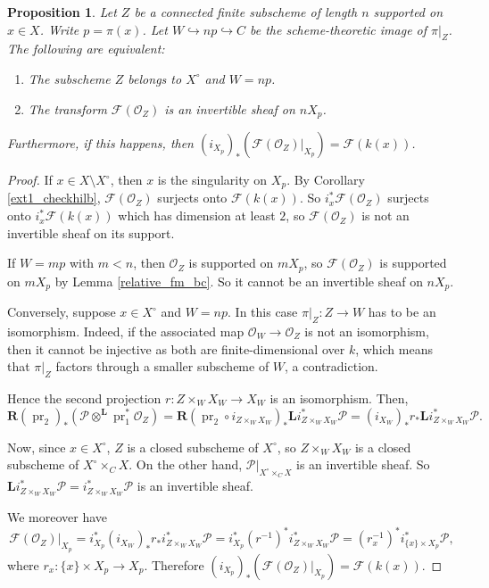 \documentclass{amsart}
\theoremstyle{plain}
\newtheorem{proposition}[theorem]{Proposition}
\theoremstyle{definition}
\theoremstyle{remark}
\begin{document}
    \begin{proposition}\label{geom_desc}
        Let $Z$ be a connected finite subscheme of length $n$ supported on $x\in X$.
        Write $p=\pi(x)$.
        Let $W\hookrightarrow np\hookrightarrow C$ be the scheme-theoretic image of $\pi|_Z$.
        The following are equivalent:
        \begin{enumerate}
            \item The subscheme $Z$ belongs to $X^\circ$ and $W=np$.
            \item The transform $\mathcal F(\mathcal O_Z)$ is an invertible sheaf on $nX_p$.
        \end{enumerate}
        Furthermore, if this happens, then $(i_{X_p})_\ast(\mathcal F(\mathcal O_Z)|_{X_p})=\mathcal F(k(x))$.
    \end{proposition}
    \begin{proof}
        If $x\in X\setminus X^\circ$, then $x$ is the singularity on $X_p$.
        By Corollary \ref{ext1_checkhilb}, $\mathcal F(\mathcal O_Z)$ surjects onto $\mathcal F(k(x))$.
        So $i_x^\ast \mathcal F(\mathcal O_Z)$ surjects onto $i_x^\ast\mathcal F(k(x))$ which has dimension at least $2$, so $\mathcal F(\mathcal O_Z)$ is not an invertible sheaf on its support.

        If $W=mp$ with $m<n$, then $\mathcal O_Z$ is supported on $mX_p$, so $\mathcal F(\mathcal O_Z)$ is supported on $mX_p$ by Lemma \ref{relative_fm_bc}.
        So it cannot be an invertible sheaf on $nX_p$.

        Conversely, suppose $x\in X^\circ$ and $W=np$.
        In this case $\pi|_Z:Z\to W$ has to be an isomorphism.
        Indeed, if the associated map $\mathcal O_W\to\mathcal O_Z$ is not an isomorphism, then it cannot be injective as both are finite-dimensional over $k$, which means that $\pi|_Z$ factors through a smaller subscheme of $W$, a contradiction.

        Hence the second projection $r:Z\times_WX_W\to X_W$ is an isomorphism.
        Then,
        \[
        \mathbf R(\operatorname{pr}_2)_\ast(\mathcal P\otimes^{\mathbf L}\operatorname{pr}_1^\ast\mathcal O_Z)=\mathbf R(\operatorname{pr}_2\circ i_{Z\times_WX_W})_\ast\mathbf Li_{Z\times_WX_W}^\ast\mathcal P=(i_{X_W})_\ast r_\ast\mathbf Li_{Z\times_WX_W}^\ast\mathcal P.
        \]

        Now, since $x\in X^\circ$, $Z$ is a closed subscheme of $X^\circ$, so $Z\times_WX_W$ is a closed subscheme of $X^\circ\times_CX$.
        On the other hand, $\mathcal P|_{X^\circ\times_C X}$ is an invertible sheaf.
        So $\mathbf Li_{Z\times_WX_W}^\ast\mathcal P=i_{Z\times_WX_W}^\ast\mathcal P$ is an invertible sheaf.

        We moreover have
        \[\mathcal F(\mathcal O_Z)|_{X_p}= i_{X_p}^\ast(i_{X_W})_\ast r_\ast i_{Z\times_WX_W}^\ast\mathcal P= i_{X_p}^\ast (r^{-1})^\ast i_{Z\times_WX_W}^\ast\mathcal P=(r_x^{-1})^\ast i_{\{x\}\times X_p}^\ast\mathcal P,
        \]
        where $r_x:\{x\}\times X_p\to X_p$.
        Therefore $(i_{X_p})_\ast(\mathcal F(\mathcal O_Z)|_{X_p})=\mathcal F(k(x))$.
    \end{proof}
\end{document}
